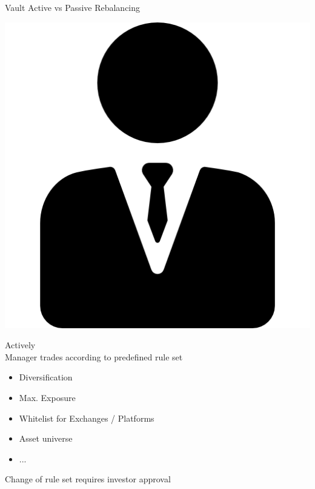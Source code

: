 \documentclass[handout]{beamer}
\begin{document}
\begin{frame}{Vault Active vs Passive Rebalancing}
	\begin{minipage}{0.4\textwidth}
		\begin{center}
			\includegraphics[scale=0.18]{../assets/images/manager.png}
		\end{center}
		\begin{center}
		Actively \\ \vspace{1em}
		Manager trades according to predefined rule set
\vspace{0.5em}		
			\begin{scriptsize}
				\begin{itemize}
					\item<1-> Diversification
					\item<2-> Max. Exposure
					\item<3-> Whitelist for Exchanges / Platforms
					\item<4->  Asset universe
					\item<5->  ...
				\end{itemize}		
			\end{scriptsize}
		\vspace{0.5em}Change of rule set requires investor approval \\
		\end{center}
		


\end{minipage}
\end{frame}
\end{document}
